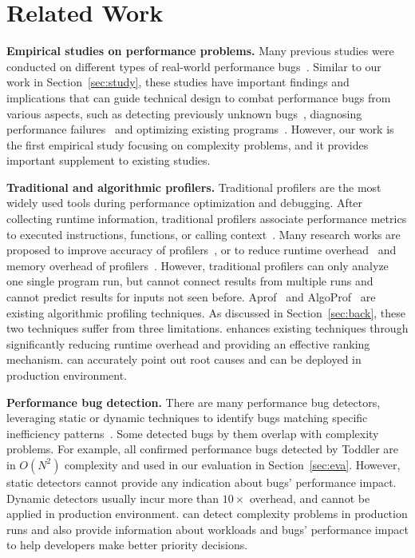 
\section{Related Work}
\label{sec:related}

\noindent\textbf{Empirical studies on performance problems.}
Many previous studies were conducted on different types 
of real-world performance
bugs~\cite{PerfBug,SongOOPSLA2014,ldoctor,Zaman2012MSR,Nistor2013MSR,HuangRegression,SmartphoneStudy,junwen-1}.
Similar to our work in Section~\ref{sec:study},
these studies have important findings and 
implications 
that can guide technical design to combat
performance bugs from various aspects, 
such as detecting previously unknown bugs~\cite{PerfBug,SmartphoneStudy,junwen-1}, 
diagnosing performance failures~\cite{SongOOPSLA2014,ldoctor} 
and optimizing existing programs~\cite{junwen-2}. 
However, our work is the first empirical study focusing 
on complexity problems,
and it provides important supplement to existing studies.

\noindent\textbf{Traditional and algorithmic profilers.}
Traditional profilers are the most widely used tools
during performance optimization and debugging.
After collecting runtime information,
traditional profilers associate performance metrics to executed instructions,
functions, or calling context~\cite{oprofile,gprof,CCT}.
Many research works are proposed to improve
accuracy of profilers~\cite{4Profilers, LagHunter, AppInsight}, or
to reduce runtime overhead~\cite{AdaptiveBurst}
and memory overhead of profilers~\cite{HotCallingContext}.
However, traditional profilers can only analyze one single program run,
but cannot connect results from multiple runs and cannot
predict results for inputs not seen before.
Aprof~\cite{Aprof1, Aprof2} and AlgoProf~\cite{AlgoProf} are existing
algorithmic profiling techniques.
As discussed in Section~\ref{sec:back},
these two techniques suffer from three limitations. 
\Tool enhances existing techniques through significantly 
reducing runtime overhead and providing an effective ranking mechanism. 
\Tool can accurately point out root causes 
and can be deployed in production environment. 


\noindent\textbf{Performance bug detection.}
There are many performance bug detectors, 
leveraging static or dynamic techniques to
identify bugs matching specific inefficiency
patterns~\cite{yufei-perf,CLARITY,xiao13:context,PerfBug,Alabama,CARAMEL,XuDataStructure,XuBloatPLDI2009,XuBloatPLDI2010,Cachetor,LoopInvariant,falsesharing}.
Some detected bugs by them overlap with complexity problems.
For example, 
all confirmed performance bugs detected by Toddler are 
in $O(N^2)$ complexity and used in our evaluation in Section~\ref{sec:eva}.
However, static detectors cannot provide any indication
about bugs' performance impact.
Dynamic detectors usually incur more than $10\times$ overhead,
and cannot be applied in production environment.
\Tool can detect complexity problems in production runs 
and also provide information about workloads and bugs' performance impact 
to help developers make better priority decisions. 

